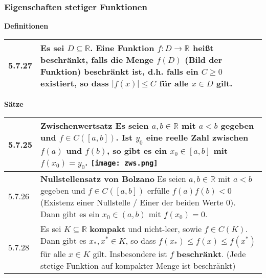 \subsubsection{Eigenschaften stetiger Funktionen}

        \noindent
    \textbf{Definitionen}
    \begin{table}[H]  
    \begin{tabularx}{\textwidth}{X m{16cm}}
        \toprule

        5.7.27& Es sei $D \subseteq \mathbb{R}$. Eine Funktion $f: D \rightarrow \mathbb{R}$ hei\ss t beschränkt, falls die Menge
                $f(D)$ (Bild der Funktion) beschränkt ist, d.h. falls ein $C \geq 0$ existiert, so dass $|f(x)| \leq C$ für alle $x \in D$ gilt. \\

        \bottomrule

    \end{tabularx}
    \end{table}

    \noindent 
    \textbf{Sätze}
    \begin{table}[H]
    \begin{tabularx}{\textwidth}{X m{16cm}}
        \toprule

        5.7.25& \textbf{Zwischenwertsatz} \hfill \break
                Es seien $a,b \in \mathbb{R}$ mit $a < b$ gegeben und $f \in C([a,b])$. Ist $y_0$ eine reelle Zahl zwischen $f(a)$ und $f(b)$,
                so gibt es ein $x_0 \in [a,b]$ mit $f(x_0) = y_0$. \hfill \break
                \texttt{[image: zws.png]} \\
        \midrule
        5.7.26& \textbf{Nullstellensatz von Bolzano} \hfill \break
                Es seien $a,b \in \mathbb{R}$ mit $a < b$ gegeben und $f \in C([a,b])$ erfülle $f(a)f(b) < 0$ (Existenz einer Nullstelle /
                Einer der beiden Werte 0).
                Dann gibt es ein $x_0 \in (a,b)$ mit $f(x_0) = 0$. \\
        \midrule
        5.7.28& Es sei $K \subseteq \mathbb{R}$ \textbf{kompakt} und nicht-leer, sowie $f \in C(K)$. Dann gibt es $x_*, x^* \in K$, so dass
                $f(x_*) \leq f(x) \leq f(x^*)$ für alle $x \in K$ gilt. Insbesondere ist $f$ \textbf{beschränkt}. (Jede stetige Funktion auf 
                kompakter Menge ist beschränkt)\\

        \bottomrule
    \end{tabularx}
    \end{table}


